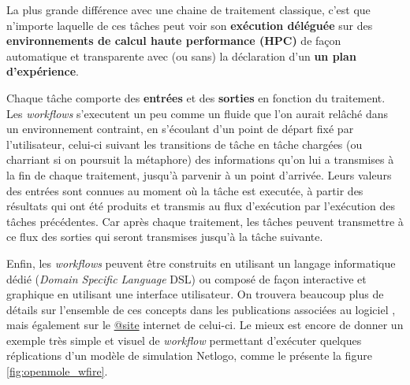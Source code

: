 La plus grande différence avec une chaine de traitement classique, c'est que n'importe laquelle de ces tâches peut voir son \textbf{exécution déléguée} sur des \textbf{environnements de calcul haute performance (HPC)} de façon automatique et transparente avec (ou sans) la déclaration d'un \textbf{un plan d'expérience}.

Chaque tâche comporte des \textbf{entrées} et des \textbf{sorties} en fonction du traitement. Les \textit{workflows} s'executent un peu comme un fluide que l'on aurait relâché dans un environnement contraint, en s'écoulant d'un point de départ fixé par l'utilisateur, celui-ci suivant les transitions de tâche en tâche chargées (ou charriant si on poursuit la métaphore) des informations qu'on lui a transmises à la fin de chaque traitement, jusqu'à parvenir à un point d'arrivée. Leurs valeurs des entrées sont connues au moment où la tâche est executée, à partir des résultats qui ont été produits et transmis au flux d'exécution par l'exécution des tâches précédentes. Car après chaque traitement, les tâches peuvent transmettre à ce flux des sorties qui seront transmises jusqu'à la tâche suivante.

Enfin, les \textit{workflows} peuvent être construits en utilisant un langage informatique dédié (\textit{Domain Specific Language} DSL) ou composé de façon interactive et graphique en utilisant une interface utilisateur. On trouvera beaucoup plus de détails sur l'ensemble de ces concepts dans les publications associées au logiciel \autocites{Reuillon2008a, Reuillon2013}, mais également sur le \href{http://www.openmole.org}{@site} internet de celui-ci. Le mieux est encore de donner un exemple très simple et visuel de \textit{workflow} permettant d'exécuter quelques réplications d'un modèle de simulation Netlogo, comme le présente la figure \ref{fig:openmole_wfire}.

